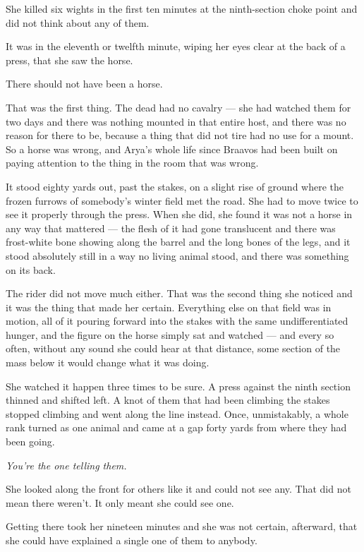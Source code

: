 She killed six wights in the first ten minutes at the ninth-section choke point and did not think about any of them.

It was in the eleventh or twelfth minute, wiping her eyes clear at the back of a press, that she saw the horse.

\sceneBreak

There should not have been a horse.

That was the first thing. The dead had no cavalry — she had watched them for two days and there was nothing mounted in that entire host, and there was no reason for there to be, because a thing that did not tire had no use for a mount. So a horse was wrong, and Arya’s whole life since Braavos had been built on paying attention to the thing in the room that was wrong.

It stood eighty yards out, past the stakes, on a slight rise of ground where the frozen furrows of somebody’s winter field met the road. She had to move twice to see it properly through the press. When she did, she found it was not a horse in any way that mattered — the flesh of it had gone translucent and there was frost-white bone showing along the barrel and the long bones of the legs, and it stood absolutely still in a way no living animal stood, and there was something on its back.

The rider did not move much either. That was the second thing she noticed and it was the thing that made her certain. Everything else on that field was in motion, all of it pouring forward into the stakes with the same undifferentiated hunger, and the figure on the horse simply sat and watched — and every so often, without any sound she could hear at that distance, some section of the mass below it would change what it was doing.

She watched it happen three times to be sure. A press against the ninth section thinned and shifted left. A knot of them that had been climbing the stakes stopped climbing and went along the line instead. Once, unmistakably, a whole rank turned as one animal and came at a gap forty yards from where they had been going.

\textit{You’re the one telling them.}

She looked along the front for others like it and could not see any. That did not mean there weren’t. It only meant she could see one.

\sceneBreak

Getting there took her nineteen minutes and she was not certain, afterward, that she could have explained a single one of them to anybody.

